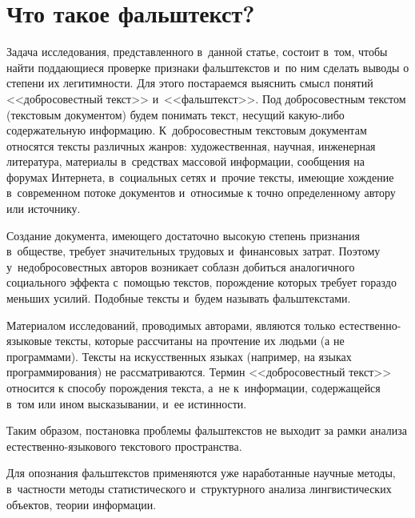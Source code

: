 


\thispagestyle{headings}

\begin{multicols}{2}

\label{st\stat}

\section{Что такое фальштекст?}

   Задача исследования, представленного в~данной статье, состоит в~том,
чтобы найти под\-да\-ющи\-еся проверке признаки фальштекстов и~по ним
сделать выводы о степени их легитимности. Для этого постараемся выяснить
смысл понятий <<доб\-ро\-со\-вест\-ный текст>> и~<<фальштекст>>. Под
добросовестным текстом (текстовым документом) будем понимать текст,
несущий ка\-кую-либо содержательную информацию. К~добросовестным
текстовым документам относятся тексты различных жанров:
художественная, научная, инженерная литература, материалы в~средствах
массовой информации,
сообщения на форумах Интернета, в~социальных сетях и~прочие тексты,
име\-ющие хождение в~современном потоке документов и~относимые к точно
определенному автору или источнику.

Создание документа, имеющего
достаточно высокую степень признания в~обществе, требует значительных
трудовых и~финансовых затрат. Поэтому у~недобросовестных авторов
возникает соблазн добиться аналогичного социального эффекта с~по\-мощью
текстов, порождение которых требует гораздо меньших усилий. Подобные
тексты и~будем называть фальштекстами.

   Материалом исследований, проводимых авторами, являются только
   ес\-те\-ст\-вен\-но-язы\-ко\-вые текс\-ты, которые рассчитаны на прочтение
их людьми (а не программами). Текс\-ты на искусственных языках (например,
на языках программирования) не рассматриваются. Термин
<<добросовестный текст>> относится к способу порождения текста, а~не
к~информации, содержащейся в~том или ином высказывании, и~ее истинности.

Таким образом, постановка проблемы фальш\-текстов не выходит за рамки
анализа ес\-те\-ст\-вен\-но-язы\-ко\-во\-го текстового пространства.

   Для опознания фальштекстов применяются уже наработанные научные
методы, в~частности методы статистического и~структурного анализа
лингвистических объектов, теории информации.


\end{multicols}
